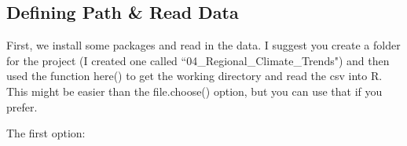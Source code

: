 \documentclass{article}\usepackage[]{graphicx}\usepackage[dvipsnames]{xcolor}
\begin{document}







\subsection{Defining Path \& Read Data}

First, we install some packages and read in the data. I suggest you create a folder for the project (I created one called ``04\_Regional\_Climate\_Trends") and then used the function here() to get the working directory and read the csv into R. This might be easier than the file.choose() option, but you can use that if you prefer.

The first option: 
\end{document}
